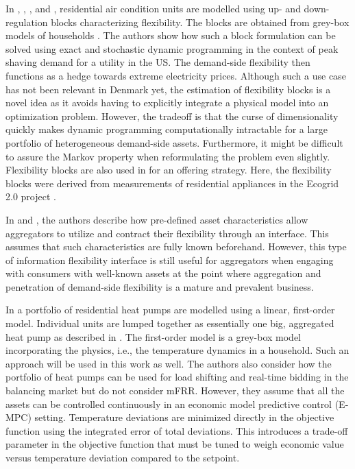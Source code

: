 In \cite{schaperow2019simulation}, \cite{chanpiwat2020using}, \cite{moglen2020optimal}, and \cite{moglen2020optimal}, residential air condition units are modelled using up- and down-regulation blocks characterizing flexibility. The blocks are obtained from grey-box models of households \cite{siemann2013performance}. The authors show how such a block formulation can be solved using exact and stochastic dynamic programming in the context of peak shaving demand for a utility in the US. The demand-side flexibility then functions as a hedge towards extreme electricity prices. Although such a use case has not been relevant in Denmark yet, the estimation of flexibility blocks is a novel idea as it avoids having to explicitly integrate a physical model into an optimization problem. However, the tradeoff is that the curse of dimensionality quickly makes dynamic programming computationally intractable for a large portfolio of heterogeneous demand-side assets. Furthermore, it might be difficult to assure the Markov property \cite{MarkovProperty} when reformulating the problem even slightly. Flexibility blocks are also used in \cite{bobo2018offering} for an offering strategy. Here, the flexibility blocks were derived from measurements of residential appliances in the Ecogrid 2.0 project \cite{ecogrid}.

In \cite{biegel2013information} and \cite{BiegelConstractingFlexServices}, the authors describe how pre-defined asset characteristics allow aggregators to utilize and contract their flexibility through an interface. This assumes that such characteristics are fully known beforehand. However, this type of information flexibility interface is still useful for aggregators when engaging with consumers with well-known assets at the point where aggregation and penetration of demand-side flexibility is a mature and prevalent business.

In \cite{biegel2013electricity} a portfolio of residential heat pumps are modelled using a linear, first-order model. Individual units are lumped together as essentially one big, aggregated heat pump as described in \cite{biegel2013lumped}. The first-order model is a grey-box model incorporating the physics, i.e., the temperature dynamics in a household. Such an approach will be used in this work as well. The authors also consider how the portfolio of heat pumps can be used for load shifting and real-time bidding in the balancing market but do not consider mFRR. However, they assume that all the assets can be controlled continuously in an economic model predictive control (E-MPC) setting. Temperature deviations are minimized directly in the objective function using the integrated error of total deviations. This introduces a trade-off parameter in the objective function that must be tuned to weigh economic value versus temperature deviation compared to the setpoint.

